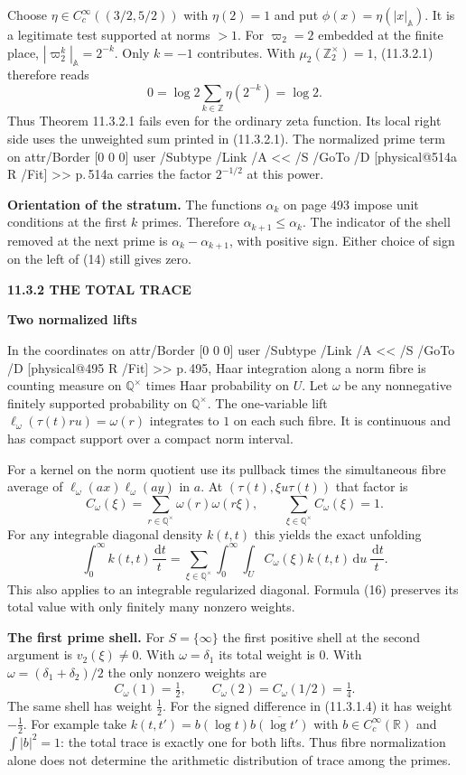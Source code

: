 \documentclass[11pt,letterpaper]{article}
\makeatletter
\newcommand{\rightmarktext}{}
\newcommand{\printfolio}{}
\newcommand{\leaf}[4]{\clearpage\gdef\printfolio{#1}\gdef\rightmarktext{#2}%
  {\small\sffamily\bfseries\color{ink}#3\par}\vspace{3pt}%
  {\LARGE\bfseries #4\par}\vspace{5pt}}
\newcommand{\point}[1]{\par\smallskip\textbf{#1.}\enspace\ignorespaces}
\newcommand{\R}{\mathbb R}
\newcommand{\Q}{\mathbb Q}
\newcommand{\Z}{\mathbb Z}
\newcommand{\A}{\mathbb A}
\newcommand{\dd}{\,\mathrm d}
\newcommand{\MusicPDFPageRef}[1]{\pdfpageref\csname physical@#1\endcsname\space\space 0 R}
\newcommand{\pagelink}[2]{\leavevmode\pdfstartlink attr{/Border [0 0 0]} user{%
  /Subtype /Link /A << /S /GoTo /D [\MusicPDFPageRef{#1} /Fit] >>}%
  {\color{ink}#2}\pdfendlink}
\newcommand{\pg}[1]{\pagelink{#1}{p.\,#1}}
\makeatother
\begin{document}
Choose $\eta\in C_c^\infty((3/2,5/2))$ with $\eta(2)=1$ and put
$\phi(x)=\eta(|x|_\A)$. It is a legitimate test supported at norms $>1$.
For $\varpi_2=2$ embedded at the finite place, $|\varpi_2^k|_\A=2^{-k}$.
Only $k=-1$ contributes. With $\mu_2(\Z_2^\times)=1$, (11.3.2.1)
therefore reads
\[
             0=\log2\sum_{k\in\Z}\eta(2^{-k})=\log2 .
 \tag{14}
\]
Thus Theorem 11.3.2.1 fails even for the ordinary zeta function. Its local
right side uses the unweighted sum printed in (11.3.2.1). The normalized
prime term on \pg{514a} carries the factor $2^{-1/2}$ at this power.

\point{Orientation of the stratum} The functions $\alpha_k$ on page 493
impose unit conditions at the first $k$ primes. Therefore
$\alpha_{k+1}\le\alpha_k$. The indicator of the shell removed at the
next prime is $\alpha_k-\alpha_{k+1}$, with positive sign. Either choice
of sign on the left of (14) still gives zero.

\leaf{495a}{Prime-shell weights}{11.3.2 \quad THE TOTAL TRACE}{Two normalized lifts}
In the coordinates on \pg{495}, Haar integration along a norm fibre is
counting measure on $\Q^\times$ times Haar probability on $U$. Let
$\omega$ be any nonnegative finitely supported probability on $\Q^\times$.
The one-variable lift $\ell_\omega(\tau(t)ru)=\omega(r)$ integrates to
$1$ on each such fibre. It is continuous and has compact support over a
compact norm interval.

For a kernel on the norm quotient use its pullback times the simultaneous
fibre average of $\ell_\omega(ax)\ell_\omega(ay)$ in $a$. At
$(\tau(t),\xi u\tau(t))$ that factor is
\[
 C_\omega(\xi)=\sum_{r\in\Q^\times}\omega(r)\omega(r\xi),
 \qquad \sum_{\xi\in\Q^\times} C_\omega(\xi)=1.
 \tag{15}
\]
For any integrable diagonal density $k(t,t)$ this yields the exact
unfolding
\[
 \int_0^\infty k(t,t)\frac{\dd t}{t}
 =\sum_{\xi\in\Q^\times}\int_0^\infty\!\int_U
       C_\omega(\xi) k(t,t)\dd u\,\frac{\dd t}{t}.
 \tag{16}
\]
This also applies to an integrable regularized diagonal. Formula (16)
preserves its total value with only finitely many nonzero weights.

\point{The first prime shell} For $S=\{\infty\}$ the first positive shell
at the second argument is $v_2(\xi)\ne0$. With $\omega=\delta_1$ its
total weight is $0$. With $\omega=(\delta_1+\delta_2)/2$ the only nonzero
weights are
\[
 C_\omega(1)=\tfrac12,\qquad
 C_\omega(2)=C_\omega(1/2)=\tfrac14 .
\]
The same shell has weight $\tfrac12$. For the signed difference in
(11.3.1.4) it has weight $-\tfrac12$. For example take
$k(t,t')=b(\log t)\overline{b(\log t')}$ with
$b\in C_c^\infty(\R)$ and $\int|b|^2=1$: the total trace is exactly one
for both lifts. Thus fibre normalization alone does not determine the
arithmetic distribution of trace among the primes.
\end{document}
